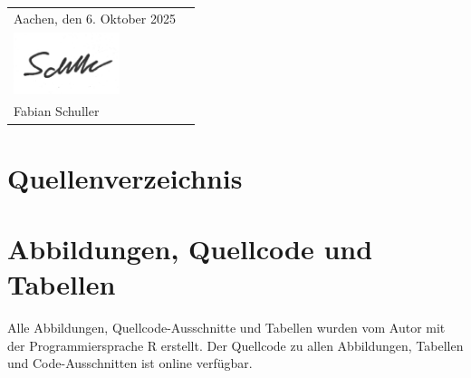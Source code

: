 \documentclass{article}
\numberwithin{equation}{subsection} %
\theoremstyle{mystyle}
\begin{document}
\noindent

\thispagestyle{empty}

\begin{tabularx}{\textwidth}{@{}lX@{}}
Aachen, den 6. Oktober 2025 
& 
\begin{flushright}

  \rule{6cm}{0.4pt} \\[-1.5cm] %
  \includegraphics[height=1.8cm]{images/unterschrift.png} \\
  Fabian Schuller
\end{flushright}

\end{tabularx}

\newpage

\tableofcontents
\newpage

















\section{Quellenverzeichnis}

\printbibliography

\section*{Abbildungen, Quellcode und Tabellen}
Alle Abbildungen, Quellcode-Ausschnitte und Tabellen wurden vom Autor mit der Programmiersprache R erstellt. Der Quellcode zu allen Abbildungen, Tabellen und Code-Ausschnitten ist online \cite{this_on_github} verfügbar.

\begin{appendices}

\end{appendices}
\end{document}
